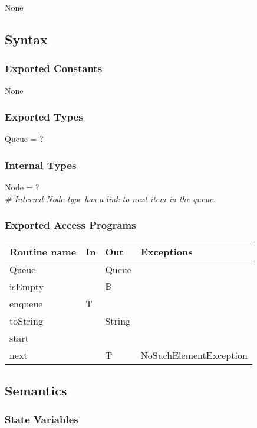 \documentclass[12pt]{article}
\begin{document}
None

\subsection* {Syntax}

\subsubsection* {Exported Constants}

None

\subsubsection* {Exported Types}

Queue = ?

\subsubsection* {Internal Types}

Node = ?\\

\noindent \textit{\# Internal Node type has a link to next item in the queue.}

\subsubsection* {Exported Access Programs}

\begin{tabular}{| l | l | l | p{5cm} |}
\hline
\textbf{Routine name} & \textbf{In} & \textbf{Out} & \textbf{Exceptions}\\
\hline
Queue & ~ & Queue & ~\\
\hline
isEmpty & ~ & $\mathbb{B}$ & ~\\
\hline
enqueue & T & ~ & ~\\
\hline
toString & ~ & String & ~\\
\hline
start & ~ & ~ & ~\\
\hline
next & ~ & T & NoSuchElementException\\
\hline
\end{tabular}

\newpage

\subsection* {Semantics}

\subsubsection* {State Variables}
\end{document}
